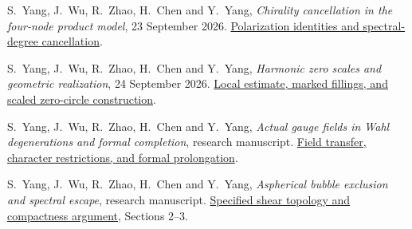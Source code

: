 \documentclass[11pt,a4paper]{article}
\theoremstyle{definition}\newtheorem{definition}[theorem]{Definition}
\theoremstyle{remark}\newtheorem{remark}[theorem]{Remark}
\newcommand{\repo}[2]{\href{https://github.com/Cherish0925/Geometric-Analysis/blob/main/#1}{#2}}
\begin{document}
\begin{thebibliography}{99}
S.~Yang, J.~Wu, R.~Zhao, H.~Chen and Y.~Yang, \emph{Chirality cancellation in the four-node product model}, 23 September 2026. \repo{research/packages/20261007_Einstein_Gaps_Two_Sessions--9d4f2de3/20261007_Einstein_Gaps_Two_Sessions/sources/Skills/geometric-analysis/research/sources/archive/sources/20260923/v08_S0910A01/workspace/notes/step100_chirality_cancellation_proof.md}{Polarization identities and spectral-degree cancellation}.

S.~Yang, J.~Wu, R.~Zhao, H.~Chen and Y.~Yang, \emph{Harmonic zero scales and geometric realization}, 24 September 2026. \repo{research/packages/20261007_Einstein_Gaps_Two_Sessions--9d4f2de3/20261007_Einstein_Gaps_Two_Sessions/sources/Skills/geometric-analysis/research/sources/continuation/20260924_harmonic_zero_scale.md}{Local estimate, marked fillings, and scaled zero-circle construction}.

S.~Yang, J.~Wu, R.~Zhao, H.~Chen and Y.~Yang, \emph{Actual gauge fields in Wahl degenerations and formal completion}, research manuscript. \repo{research/notes/Wahl_Fields_and_Formal_Completion.md}{Field transfer, character restrictions, and formal prolongation}.

S.~Yang, J.~Wu, R.~Zhao, H.~Chen and Y.~Yang, \emph{Aspherical bubble exclusion and spectral escape}, research manuscript. \repo{research/packages/20261007_Einstein_Gaps_Two_Sessions--9d4f2de3/20261007_Einstein_Gaps_Two_Sessions/sources/Skills/geometric-analysis/research/sources/mathematics/current/line1_aspherical_no_bubbles.md}{Specified shear topology and compactness argument}, Sections 2--3.
\end{thebibliography}
\end{document}
